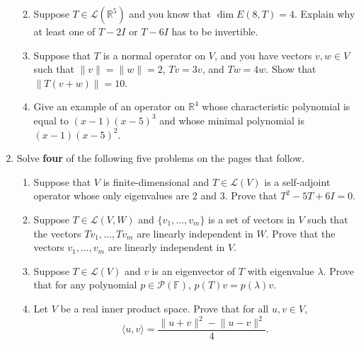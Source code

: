 \documentclass[12pt]{article}
\newcommand{\points}[1]{\marginpar{\hspace{24pt}[#1]}}
\newcommand{\R}{\mathbb{R}}
\renewcommand{\P}{\mathcal{P}}
\newcommand{\len}[1]{\lVert #1\rVert}
\renewcommand{\L}{\mathcal{L}}
\begin{document}
\begin{enumerate}
\begin{enumerate}
\vspace{2.5in}

 \item Suppose $T\in\L(\R^5)$ and you know that $\dim E(8,T)=4$. Explain why at least one of $T-2I$ or $T-6I$ has to be invertible. \points{3}

\newpage

 \item Suppose that $T$ is a normal operator on $V$, and you have vectors $v,w\in V$ such that $\len{v}=\len{w}=2$, $Tv=3v$, and $Tw=4w$. Show that $\len{T(v+w)}=10$. \points{3}

\vspace{3.5in}

 \item Give an example of an operator on $\R^4$ whose characteristic polynomial is equal to $(x-1)(x-5)^3$ and whose minimal polynomial is $(x-1)(x-5)^2$. \points{3}

\end{enumerate}
\newpage

\item Solve {\bf four} of the following five problems on the pages that follow.\label{1}

\bigskip


\begin{enumerate}
 \item Suppose that $V$ is finite-dimensional and $T\in\L(V)$ is a self-adjoint operator whose only eigenvalues are 2 and 3. Prove that $T^2-5T+6I=0$.\points{6}

\vspace{1in}

 \item Suppose $T\in\L(V,W)$ and $\{v_1,\ldots, v_m\}$ is a set of vectors in $V$ such that the vectors $Tv_1,\ldots, Tv_m$ are linearly independent in $W$. Prove that the vectors $v_1,\ldots, v_m$ are linearly independent in $V$. \points{6}

\vspace{1in}

 \item Suppose $T\in\L(V)$ and $v$ is an eigenvector of $T$ with eigenvalue $\lambda$. Prove that for any polynomial $p\in\P(\mathbb{F})$, $p(T)v = p(\lambda)v$.\points{6}

\vspace{1in}

 \item Let $V$ be a real inner product space. Prove that for all $u,v\in V$,\points{6}
\[
 \langle u,v\rangle = \frac{\len{u+v}^2-\len{u-v}^2}{4}.
\]


\end{enumerate}
\end{enumerate}
\end{document}
